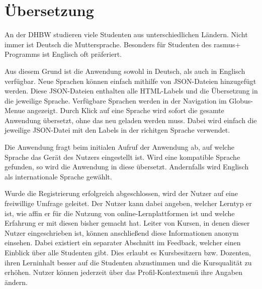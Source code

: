




\section{Übersetzung}

An der DHBW studieren viele Studenten aus unterschiedlichen Ländern.
Nicht immer ist Deutsch die Muttersprache.
Besonders für Studenten des rasmus+ Programms ist Englisch oft präferiert.

Aus diesem Grund ist die Anwendung sowohl in Deutsch, als auch in Englisch verfügbar.
Neue Sprachen können einfach mithilfe von JSON-Dateien hinzugefügt werden.
Diese JSON-Dateien enthalten alle HTML-Labels und die Übersetzung in die jeweilige Sprache. 
Verfügbare Sprachen werden in der Navigation im Globus-Menue angezeigt.
Durch Klick auf eine Sprache wird sofort die gesamte Anwendung übersetzt, ohne das neu geladen werden muss.
Dabei wird einfach die jeweilige JSON-Datei mit den Labels in der richitgen Sprache verwendet.

Die Anwendung fragt beim initialen Aufruf der Anwendung ab, auf welche Sprache das Gerät des Nutzers eingestellt ist.
Wird eine kompatible Sprache gefunden, so wird die Anwendung in diese übersetzt.
Andernfalls wird Englisch als internationale Sprache gewählt.





Wurde die Registrierung erfolgreich abgeschlossen, wird der Nutzer auf eine freiwillige Umfrage geleitet.
Der Nutzer kann dabei angeben, welcher Lerntyp er ist, wie affin er für die Nutzung von online-Lernplattformen ist und welche Erfahrung er mit diesen bisher gemacht hat.
Leiter von Kursen, in denen dieser Nutzer eingeschrieben ist, können anschließend diese Informationen anonym einsehen.
Dabei existiert ein separater Abschnitt im Feedback, welcher einen Einblick über alle Studenten gibt.
Dies erlaubt es Kursbesitzern bzw. Dozenten, ihren Lerninhalt besser auf die Studenten abzustimmen und die Kursqualität zu erhöhen.
Nutzer können jederzeit über das Profil-Kontextmenü ihre Angaben ändern.



